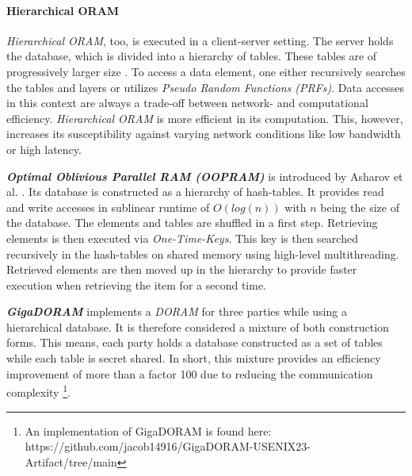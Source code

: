 \paragraph{Hierarchical ORAM}\label{par:hierarchicalORAM}
\textit{Hierarchical ORAM}, too, is executed in a client-server setting.
The server holds the database, which is divided into a hierarchy of tables.
These tables are of progressively larger size \cite{peserico2023hierarchical}.
To access a data element, one either recursively searches the tables and layers or utilizes \textit{Pseudo Random Functions (PRFs)}.
Data accesses in this context are always a trade-off between network- and computational efficiency.
\textit{Hierarchical ORAM} is more efficient in its computation.
This, however, increases its susceptibility against varying network conditions like low bandwidth or high latency.

\textbf{\textit{Optimal Oblivious Parallel RAM (OOPRAM)}} is introduced by Asharov et al. \cite{asharov2022oopram}.
Its database is constructed as a hierarchy of hash-tables.
It provides read and write accesses in sublinear runtime of $O(log(n))$ with $n$ being the size of the database.
The elements and tables are shuffled in a first step.
Retrieving elements is then executed via \textit{One-Time-Keys}.
This key is then searched recursively in the hash-tables on shared memory using high-level multithreading.
Retrieved elements are then moved up in the hierarchy to provide faster execution when retrieving the item for a second time.

\textbf{\textit{GigaDORAM}} \cite{falk2023gigadoram} implements a \textit{DORAM} for three parties while using a hierarchical database. 
It is therefore considered a mixture of both construction forms.
This means, each party holds a database constructed as a set of tables while each table is secret shared.
In short, this mixture provides an efficiency improvement of more than a factor 100 due to reducing the communication complexity \footnote{An implementation of GigaDORAM is found here: https://github.com/jacob14916/GigaDORAM-USENIX23-Artifact/tree/main}.